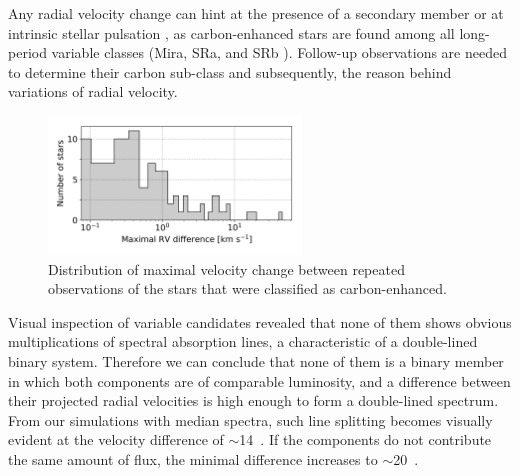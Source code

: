 Any radial velocity change can hint at the presence of a secondary member or at intrinsic stellar pulsation \cite{2002AA...390..987B, 2010JApA...31..177L, 2012A&A...544A..10B}, as carbon-enhanced stars are found among all long-period variable classes (Mira, SRa, and SRb  \cite{2013A&A...553A..93B, 2014A&A...568A.100B}). Follow-up observations are needed to determine their carbon sub-class and subsequently, the reason behind variations of radial velocity.

\begin{figure}
	\centering
	\includegraphics[width=0.6\textwidth]{rv_rep_dist.png}
	\caption{Distribution of maximal velocity change between repeated observations of the stars that were classified as carbon-enhanced.}
	\label{fig:rv_rep_dist}
\end{figure}

Visual inspection of variable candidates revealed that none of them shows obvious multiplications of spectral absorption lines, a characteristic of a double-lined binary system. Therefore we can conclude that none of them is a binary member in which both components are of comparable luminosity, and a difference between their projected radial velocities is high enough to form a double-lined spectrum. From our simulations with median spectra, such line splitting becomes visually evident at the velocity difference of $\sim$14~\kms. If the components do not contribute the same amount of flux, the minimal difference increases to $\sim$20~\kms.

